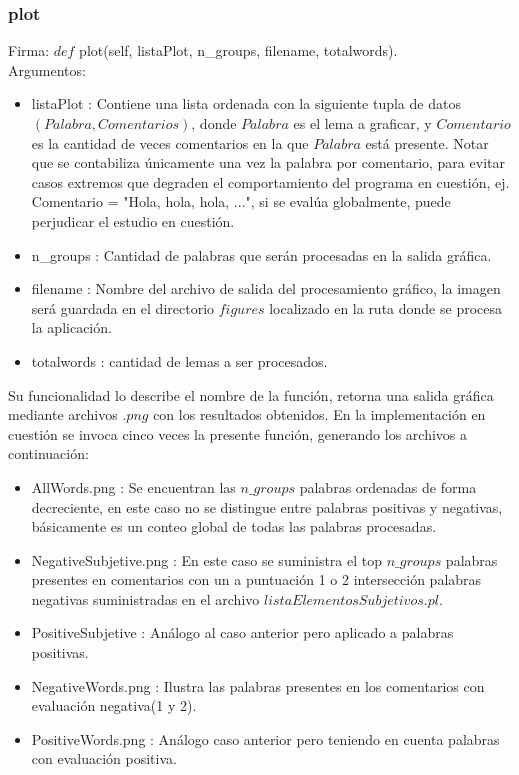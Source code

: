 \documentclass[12pt]{article}
\begin{document}
\subsubsection{plot} \label{func:plot}
Firma: $def$ plot(self, listaPlot, n\_groups, filename, totalwords). \\
Argumentos:
\begin{itemize}
  \item listaPlot : Contiene una lista ordenada con la siguiente tupla de datos $(Palabra, Comentarios)$, donde $Palabra$ es el lema a graficar, y $Comentario$ es la cantidad de veces comentarios en la que $Palabra$ está presente. Notar que se contabiliza únicamente una vez la palabra por comentario, para evitar casos extremos que degraden el comportamiento del programa en cuestión, ej. Comentario = "Hola, hola, hola, ...", si se evalúa globalmente, puede perjudicar el estudio en cuestión.
  \item n\_groups : Cantidad de palabras que serán procesadas en la salida gráfica.
  \item filename : Nombre del archivo de salida del procesamiento gráfico, la imagen será guardada en el directorio $figures$ localizado en la ruta donde se procesa la aplicación.
  \item totalwords : cantidad de lemas a ser procesados.
\end{itemize}

Su funcionalidad lo describe el nombre de la función, retorna una salida gráfica mediante archivos $.png$ con los resultados obtenidos.
En la implementación en cuestión se invoca cinco veces la presente función, generando los archivos a continuación:
\begin{itemize}
  \item AllWords.png : Se encuentran las $n\_groups$ palabras ordenadas de forma decreciente, en este caso no se distingue entre palabras positivas y negativas, básicamente es un conteo global de todas las palabras procesadas.
  \item NegativeSubjetive.png : En este caso se suministra el top $n\_groups$ palabras presentes en comentarios con un a puntuación 1 o 2 intersección palabras negativas suministradas en el archivo $listaElementosSubjetivos.pl$.
  \item PositiveSubjetive : Análogo al caso anterior pero aplicado a palabras positivas.
  \item NegativeWords.png : Ilustra las palabras presentes en los comentarios con evaluación negativa(1 y 2).
  \item PositiveWords.png : Análogo caso anterior pero teniendo en cuenta palabras con evaluación positiva.
\end{itemize}
\end{document}
